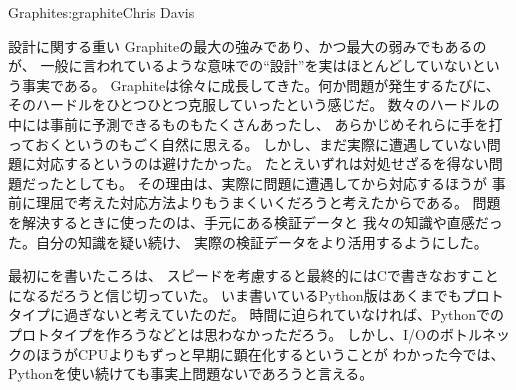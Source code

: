 \begin{aosachapter}{Graphite}{s:graphite}{Chris Davis}
\begin{aosasect1}{設計に関する重い}
Graphiteの最大の強みであり、かつ最大の弱みでもあるのが、
一般に言われているような意味での``設計''を実はほとんどしていないという事実である。
Graphiteは徐々に成長してきた。何か問題が発生するたびに、
そのハードルをひとつひとつ克服していったという感じだ。
数々のハードルの中には事前に予測できるものもたくさんあったし、
あらかじめそれらに手を打っておくというのもごく自然に思える。
しかし、まだ実際に遭遇していない問題に対応するというのは避けたかった。
たとえいずれは対処せざるを得ない問題だったとしても。
その理由は、実際に問題に遭遇してから対応するほうが
事前に理屈で考えた対応方法よりもうまくいくだろうと考えたからである。
問題を解決するときに使ったのは、手元にある検証データと
我々の知識や直感だった。自分の知識を疑い続け、
実際の検証データをより活用するようにした。

最初にを書いたころは、
スピードを考慮すると最終的にはCで書きなおすことになるだろうと信じ切っていた。
いま書いているPython版はあくまでもプロトタイプに過ぎないと考えていたのだ。
時間に迫られていなければ、Pythonでのプロトタイプを作ろうなどとは思わなかっただろう。
しかし、I/OのボトルネックのほうがCPUよりもずっと早期に顕在化するということが
わかった今では、Pythonを使い続けても事実上問題ないであろうと言える。


\end{aosasect1}
\end{aosachapter}
